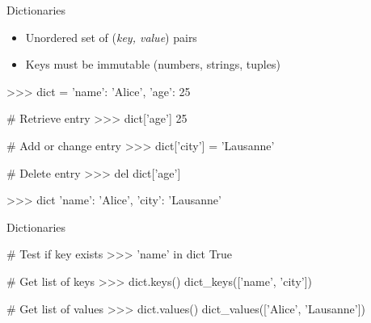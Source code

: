 \documentclass[10pt]{beamer}
\begin{document}
\begin{frame}[fragile]{Dictionaries}

    \begin{itemize}
        \item \pause Unordered set of (\emph{key, value}) pairs
        \item \pause Keys must be immutable (numbers, strings, tuples)
    \end{itemize}

    \pause

    \begin{pythoncode}
        >>> dict = {'name': 'Alice', 'age': 25}
    \end{pythoncode}

    \pause

    \begin{pythoncode}
        # Retrieve entry
        >>> dict['age']
        25
    \end{pythoncode}

    \pause

    \begin{pythoncode}
        # Add or change entry
        >>> dict['city'] = 'Lausanne'

        # Delete entry
        >>> del dict['age']
    \end{pythoncode}

    \pause

    \begin{pythoncode}
        >>> dict
        {'name': 'Alice', 'city': 'Lausanne'}
    \end{pythoncode}

\end{frame}


\begin{frame}[fragile]{Dictionaries}

    \begin{pythoncode}
        # Test if key exists
        >>> 'name' in dict
        True
    \end{pythoncode}

    \pause

    \begin{pythoncode}
        # Get list of keys
        >>> dict.keys()
        dict_keys(['name', 'city'])
    \end{pythoncode}

    \pause

    \begin{pythoncode}
        # Get list of values
        >>> dict.values()
        dict_values(['Alice', 'Lausanne'])
    \end{pythoncode}

\end{frame}
\end{document}
